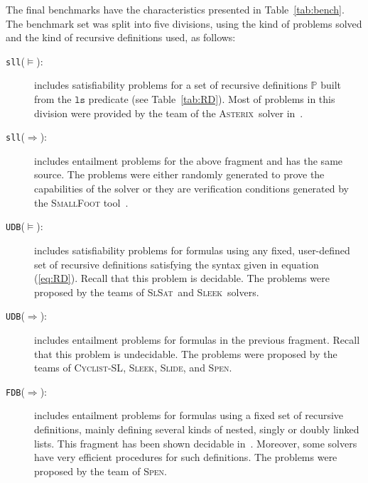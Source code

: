 \documentclass[twoside,11pt]{article}
\newcommand{\limp}{\Rightarrow}
\newcommand{\preds}{\mathbb{P}}
\newcommand{\ls}{\mathtt{ls}}
\newcommand{\sllsat}{\texttt{sll}($\models$)}
\newcommand{\sllent}{\texttt{sll}($\limp$)}
\newcommand{\FDBent}{\texttt{FDB}($\limp$)}
\newcommand{\UDBsat}{\texttt{UDB}($\models$)}
\newcommand{\UDBent}{\texttt{UDB}($\limp$)}
\newcommand{\ASTERIX}{\textsc{Asterix}}
\newcommand{\CYCLIST}{\textsc{Cyclist-SL}}
\newcommand{\SLEEK}{\textsc{Sleek}}
\newcommand{\SLIDE}{\textsc{Slide}}
\newcommand{\SLSAT}{\textsc{SlSat}}
\newcommand{\SPEN}{\textsc{Spen}}
\begin{document}
The final benchmarks have the characteristics presented in Table~\ref{tab:bench}.
The benchmark set was split into five divisions, using the kind of problems solved and the kind of recursive definitions used, as follows:
\begin{description}
\item[\sllsat:] includes satisfiability problems for a set of recursive definitions $\preds$ built from the $\ls$ predicate (see Table~\ref{tab:RD}).
Most of problems in this division were provided by the team of the \ASTERIX\ solver in~\cite{PerezR11}.

\item[\sllent:] includes entailment problems for the above fragment and has the same source. The problems were either randomly generated to prove the capabilities of the solver or they are verification conditions generated by the \textsc{SmallFoot} tool~\cite{SmallFootsite}.

\item[\UDBsat:] includes satisfiability problems for formulas using any fixed, user-defined set of recursive definitions satisfying the syntax given in equation (\ref{eq:RD}).
Recall that this problem is decidable. 
The problems were proposed by the teams of \SLSAT\ and \SLEEK\ solvers.

\item[\UDBent:] includes entailment problems for formulas in the previous fragment.
Recall that this problem is undecidable. 
The problems were proposed by the teams of \CYCLIST, \SLEEK, \SLIDE, and \SPEN.

\item[\FDBent:] includes entailment problems for formulas using a fixed set of recursive definitions, mainly defining several kinds of nested, singly or doubly linked lists. This fragment has been shown decidable in~\cite{AntonopoulosGHKO14,EneaLSV14}.
Moreover, some solvers have very efficient procedures for such definitions.
The problems were proposed by the team of \SPEN.
\end{description} 
 
\end{document}
